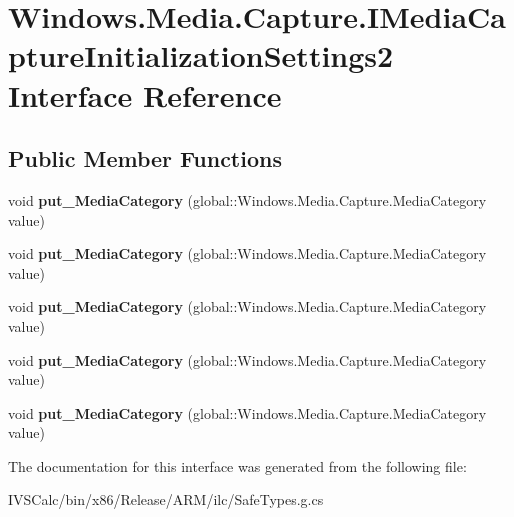 \hypertarget{interface_windows_1_1_media_1_1_capture_1_1_i_media_capture_initialization_settings2}{}\section{Windows.\+Media.\+Capture.\+I\+Media\+Capture\+Initialization\+Settings2 Interface Reference}
\label{interface_windows_1_1_media_1_1_capture_1_1_i_media_capture_initialization_settings2}
\subsection*{Public Member Functions}
\begin{DoxyCompactItemize}
\item 
\mbox{\label{interface_windows_1_1_media_1_1_capture_1_1_i_media_capture_initialization_settings2_ad847c40c1e35ea307d7b7b84b60eeca9}} 
void {\bfseries put\+\_\+\+Media\+Category} (global\+::\+Windows.\+Media.\+Capture.\+Media\+Category value)
\item 
\mbox{\label{interface_windows_1_1_media_1_1_capture_1_1_i_media_capture_initialization_settings2_ad847c40c1e35ea307d7b7b84b60eeca9}} 
void {\bfseries put\+\_\+\+Media\+Category} (global\+::\+Windows.\+Media.\+Capture.\+Media\+Category value)
\item 
\mbox{\label{interface_windows_1_1_media_1_1_capture_1_1_i_media_capture_initialization_settings2_ad847c40c1e35ea307d7b7b84b60eeca9}} 
void {\bfseries put\+\_\+\+Media\+Category} (global\+::\+Windows.\+Media.\+Capture.\+Media\+Category value)
\item 
\mbox{\label{interface_windows_1_1_media_1_1_capture_1_1_i_media_capture_initialization_settings2_ad847c40c1e35ea307d7b7b84b60eeca9}} 
void {\bfseries put\+\_\+\+Media\+Category} (global\+::\+Windows.\+Media.\+Capture.\+Media\+Category value)
\item 
\mbox{\label{interface_windows_1_1_media_1_1_capture_1_1_i_media_capture_initialization_settings2_ad847c40c1e35ea307d7b7b84b60eeca9}} 
void {\bfseries put\+\_\+\+Media\+Category} (global\+::\+Windows.\+Media.\+Capture.\+Media\+Category value)
\end{DoxyCompactItemize}


The documentation for this interface was generated from the following file\+:\begin{DoxyCompactItemize}
\item 
I\+V\+S\+Calc/bin/x86/\+Release/\+A\+R\+M/ilc/Safe\+Types.\+g.\+cs\end{DoxyCompactItemize}
